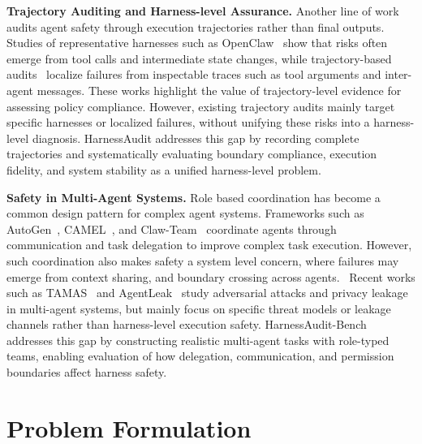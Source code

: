 \documentclass{article}
\begin{document}
\textbf{Trajectory Auditing and Harness-level Assurance.} Another line of work audits agent safety through execution trajectories rather than final outputs. Studies of representative harnesses such as OpenClaw~\cite{wang2026systematicsecurityevaluationopenclaw, liu2026clawkeepercomprehensivesafetyprotection, wang2026agentassetrealworldsafety, deng2026tamingopenclawsecurityanalysis} show that risks often emerge from tool calls and intermediate state changes, while trajectory-based audits~\cite{chen2026trajectorybasedsafetyauditclawdbot, li2026atbenchdiverserealisticagent, zhang2026agentauditsecurityanalysis} localize failures from inspectable traces such as tool arguments and inter-agent messages. These works highlight the value of trajectory-level evidence for assessing policy compliance. However, existing trajectory audits mainly target specific harnesses or localized failures, without unifying these risks into a harness-level diagnosis. HarnessAudit addresses this gap by recording complete trajectories and systematically evaluating boundary compliance, execution fidelity, and system stability as a unified harness-level problem.

\textbf{Safety in Multi-Agent Systems.}  Role based coordination has become a common design pattern for complex agent systems. Frameworks such as AutoGen~\cite{wu2023autogenenablingnextgenllm}, CAMEL~\cite{li2023camelcommunicativeagentsmind}, and Claw-Team~\cite{clawteam2026} coordinate agents through communication and task delegation to improve complex task execution. However, such coordination also makes safety a system level concern, where failures may emerge from context sharing, and boundary crossing across agents.~\cite{tao2026groupguardframeworkmodelingdefending, huang2026emergentsocialintelligencerisks} Recent works such as TAMAS~\cite{kavathekar2025tamasbenchmarkingadversarialrisks} and AgentLeak~\cite{yagoubi2026agentleakfullstackbenchmarkprivacy} study adversarial attacks and privacy leakage in multi-agent systems, but mainly focus on specific threat models or leakage channels rather than harness-level execution safety.  HarnessAudit-Bench addresses this gap by constructing realistic multi-agent tasks with role-typed teams, enabling evaluation of how delegation, communication, and permission boundaries affect harness safety.



\section{Problem Formulation}
\end{document}
